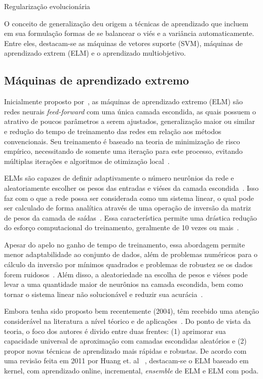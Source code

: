 \documentclass[conference]{IEEEtran}
\begin{document}
	
	Regularização evolucionária \cite{jin2004neural}

	O conceito de generalização deu origem a técnicas de aprendizado que incluem em sua formulação formas de se balancear o viés e a variância automaticamente. Entre eles, destacam-se as máquinas de vetores suporte (SVM), máquinas de aprendizado extrem (ELM)  e o aprendizado multiobjetivo.
	
	\subsection{Máquinas de aprendizado extremo}
	Inicialmente proposto por~\cite{huang2004extreme}, as máquinas de aprendizado extremo (ELM) são redes neurais \textit{feed-forward} com uma única camada escondida, as quais possuem o atrativo de poucos parâmetros a serem ajustados, generalização maior ou similar e redução do tempo de treinamento das redes em relação aos métodos convencionais. Seu treinamento é baseado na teoria de minimização de risco empírico, necessitando de somente uma iteração para este processo, evitando múltiplas iterações e algoritmos de otimização local~\cite{ding2015extreme}. 
	
	ELMs são capazes de definir adaptivamente o número neurônios da rede e aleatoriamente escolher os pesos das entradas e viéses da camada escondida~\cite{huang2006extreme}. Isso faz com o que a rede possa ser considerada como um sistema linear, o qual pode ser calculado de forma analítica através de uma operação de inversão da matriz de pesos da camada de saídas~\cite{huang2006extreme}. Essa característica permite uma drástica redução do esforço computacional do treinamento, geralmente de 10 vezes ou mais~\cite{deng2010research}. 
	
	Apesar do apelo no ganho de tempo de treinamento, essa abordagem permite menor adaptabilidade ao conjunto de dados, além de problemas numéricos para o cálculo da inversão por mínimos quadrados e problemas de robustez se os dados forem ruidosos~\cite{ding2015extreme}. Além disso, a aleatoriedade na  escolha de pesos e viéses pode levar a uma quantidade maior de neurônios na camada escondida, bem como tornar o sistema linear não solucionável e reduzir sua acurácia~\cite{wang2011study}.
	
	Embora tenha sido proposto bem recentemente (2004), têm recebido uma atenção considerável na literatura a nível téorico e de aplicações~\cite{huang2011survey}. Do ponto de vista da teoria, o foco dos autores é divido entre duas frentes: (1) aprimorar sua capacidade universal de aproximação com camadas escondidas aleatórios e (2) propor novas técnicas de aprendizado mais rápidas e robustas. 
	De acordo com uma revisão feita em 2011 por Huang et. al ~\cite{huang2011survey}, destacam-se o ELM baseado em kernel, com aprendizado online, incremental, \textit{ensemble} de ELM e ELM com poda.
	
\end{document}
